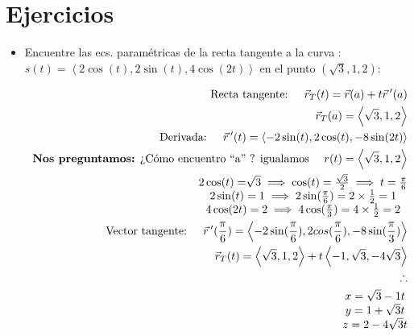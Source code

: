 \section{Ejercicios}
\begin{itemize}
    \item Encuentre las ecs. paramétricas de la recta tangente a la curva : $s(t)=\left\langle 2\cos(t),2\sin(t),4\cos(2t) \right\rangle $ en el punto $(\sqrt{3},1,2)$:
        \begin{center}
            \begin{align*}
                \text{  Recta tangente:  } \quad \vec{r}_T(t) = \vec{r}(a)+t \vec{r}\,'(a) \\ 
                \vec{r}_T(a) = \left\langle \sqrt{3},1,2 \right\rangle \\ 
                \text{  Derivada: } \quad \vec{r}\,'(t) = \left\langle -2\sin(t),2\cos(t),-8\sin(2t) \right\rangle \\ 
                \text{  \textbf{Nos preguntamos:} ¿Cómo encuentro ``a'' ? igualamos   } \quad r(t) = \left\langle \sqrt{3},1,2 \right\rangle  \\ 
                \begin{matrix}
                    2\cos(t) = \sqrt[]{3} \implies \cos(t) = \frac{\sqrt{3}}{2} \implies t = \frac{\pi }{6}  \\ 
                    2\sin(t) = 1 \implies 2\sin(\frac{\pi }{6} ) = 2 \times \frac{1}{2} = 1\\ 
                    4 \cos(2t)=2 \implies 4\cos(\frac{\pi }{3} ) = 4 \times \frac{1}{2} = 2\\ 
                \end{matrix} \\ 
                \text{  Vector tangente:   } \quad \vec{r}\,'(\frac{\pi }{6} )= \left\langle -2\sin(\frac{\pi }{6}),2cos(\frac{\pi}{6} ), -8\sin(\frac{\pi }{3} )  \right\rangle \\ 
                \vec{r}_T(t)= \left\langle \sqrt{3},1,2 \right\rangle + t \left\langle -1,\sqrt{3},-4\sqrt{3} \right\rangle \\ 
                \therefore  \\ 
                \begin{matrix}
                    x= \sqrt{3}-1t \\ 
                    y=1+\sqrt{3}t \\ 
                    z=2-4\sqrt{3}t \\ 
                \end{matrix}\\ 
            \end{align*}
        \end{center}
\end{itemize}


















